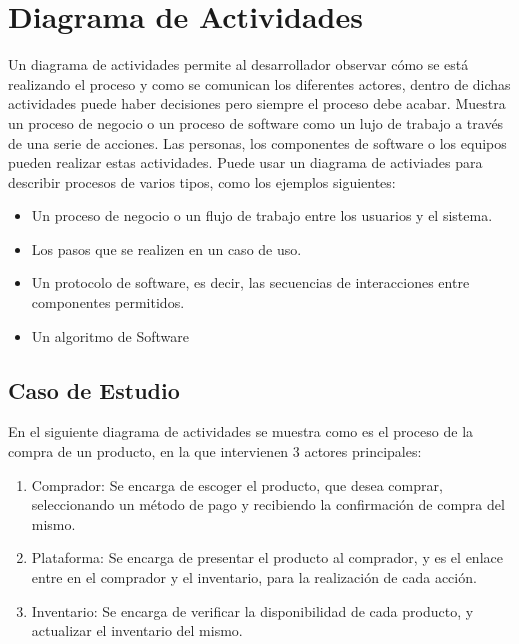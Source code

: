 \section{Diagrama de Actividades}
Un diagrama de actividades permite al desarrollador observar cómo se está realizando el proceso y como se comunican los diferentes actores, dentro de dichas actividades puede haber decisiones pero siempre el proceso debe acabar.\newline
Muestra un proceso de negocio o un proceso de software como un lujo de trabajo a través de una serie de acciones. Las personas, los componentes de software o los equipos pueden realizar estas actividades.
Puede usar un diagrama de activiades para describir procesos de varios tipos, como los ejemplos siguientes:
\begin{itemize}
   \item Un proceso de negocio o un flujo de trabajo entre los usuarios y el sistema.
	\item Los pasos que se realizen en un caso de uso.
	\item Un protocolo de software, es decir, las secuencias de interacciones entre componentes permitidos.
	\item Un algoritmo de Software
\end{itemize} 

\subsection*{Caso de Estudio}

En el siguiente diagrama de actividades se muestra como es el proceso de la compra de un producto, en la que intervienen 3 actores principales:
\begin{enumerate}
	\item Comprador: Se encarga de escoger el producto, que desea comprar, seleccionando un método de pago y recibiendo la confirmación de compra del mismo.
	\item Plataforma: Se encarga de presentar el producto al comprador, y es el enlace entre en el comprador y el inventario, para la realización de cada acción.
	\item Inventario: Se encarga de verificar la disponibilidad de cada producto, y actualizar el inventario del mismo.
\end{enumerate}

